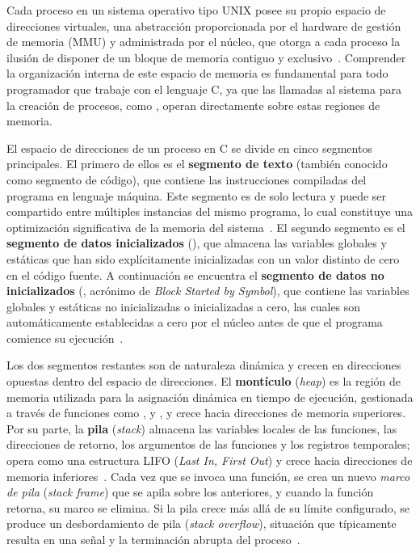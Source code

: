 Cada proceso en un sistema operativo tipo UNIX posee su propio espacio de direcciones virtuales, una abstracción proporcionada por el hardware de gestión de memoria (MMU) y administrada por el núcleo, que otorga a cada proceso la ilusión de disponer de un bloque de memoria contiguo y exclusivo~\cite{tanenbaum2015}. Comprender la organización interna de este espacio de memoria es fundamental para todo programador que trabaje con el lenguaje C, ya que las llamadas al sistema para la creación de procesos, como , operan directamente sobre estas regiones de memoria.

El espacio de direcciones de un proceso en C se divide en cinco segmentos principales. El primero de ellos es el \textbf{segmento de texto} (también conocido como segmento de código), que contiene las instrucciones compiladas del programa en lenguaje máquina. Este segmento es de solo lectura y puede ser compartido entre múltiples instancias del mismo programa, lo cual constituye una optimización significativa de la memoria del sistema~\cite{stevens2013}. El segundo segmento es el \textbf{segmento de datos inicializados} (), que almacena las variables globales y estáticas que han sido explícitamente inicializadas con un valor distinto de cero en el código fuente. A continuación se encuentra el \textbf{segmento de datos no inicializados} (, acrónimo de \textit{Block Started by Symbol}), que contiene las variables globales y estáticas no inicializadas o inicializadas a cero, las cuales son automáticamente establecidas a cero por el núcleo antes de que el programa comience su ejecución~\cite{kerrisk2010}.

Los dos segmentos restantes son de naturaleza dinámica y crecen en direcciones opuestas dentro del espacio de direcciones. El \textbf{montículo} (\textit{heap}) es la región de memoria utilizada para la asignación dinámica en tiempo de ejecución, gestionada a través de funciones como ,  y , y crece hacia direcciones de memoria superiores. Por su parte, la \textbf{pila} (\textit{stack}) almacena las variables locales de las funciones, las direcciones de retorno, los argumentos de las funciones y los registros temporales; opera como una estructura LIFO (\textit{Last In, First Out}) y crece hacia direcciones de memoria inferiores~\cite{stevens2013}. Cada vez que se invoca una función, se crea un nuevo \textit{marco de pila} (\textit{stack frame}) que se apila sobre los anteriores, y cuando la función retorna, su marco se elimina. Si la pila crece más allá de su límite configurado, se produce un desbordamiento de pila (\textit{stack overflow}), situación que típicamente resulta en una señal  y la terminación abrupta del proceso~\cite{kerrisk2010}.

